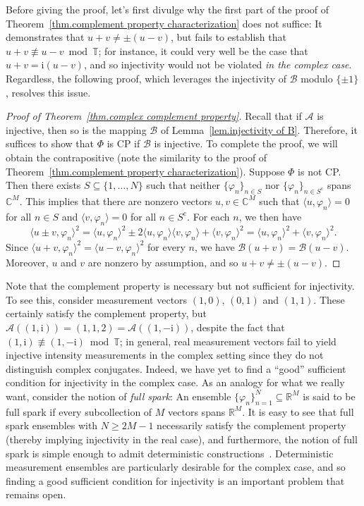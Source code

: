 \documentclass[times,10pt]{elsarticle}
\theoremstyle{plain}
\begin{document}
Before giving the proof, let's first divulge why the first part of the proof of Theorem~\ref{thm.complement property characterization} does not suffice: 
It demonstrates that $u+v\neq\pm(u-v)$, but fails to establish that $u+v\not\equiv u-v\bmod\mathbb{T}$; for instance, it could very well be the case that $u+v=\mathrm{i}(u-v)$, and so injectivity would not be violated \textit{in the complex case}.
Regardless, the following proof, which leverages the injectivity of $\mathcal{B}$ modulo $\{\pm1\}$, resolves this issue.

\begin{proof}[Proof of Theorem~\ref{thm.complex complement property}]
Recall that if $\mathcal{A}$ is injective, then so is the mapping $\mathcal{B}$ of Lemma~\ref{lem.injectivity of B}.
Therefore, it suffices to show that $\Phi$ is CP if $\mathcal{B}$ is injective.
To complete the proof, we will obtain the contrapositive (note the similarity to the proof of Theorem~\ref{thm.complement property characterization}).
Suppose $\Phi$ is not CP. 
Then there exists $S\subseteq\{1,\ldots,N\}$ such that neither $\{\varphi_n\}_{n\in S}$ nor $\{\varphi_n\}_{n\in S^\mathrm{c}}$ spans $\mathbb{C}^M$. 
This implies that there are nonzero vectors $u,v\in\mathbb{C}^M$ such that $\langle u,\varphi_n\rangle=0$ for all $n\in S$ and $\langle v,\varphi_n\rangle=0$ for all $n\in S^\mathrm{c}$.
For each $n$, we then have
\begin{equation*}
\langle u\pm v,\varphi_n\rangle^2
=\langle u,\varphi_n\rangle^2\pm2\langle u,\varphi_n\rangle\langle v,\varphi_n\rangle+\langle v,\varphi_n\rangle^2
=\langle u,\varphi_n\rangle^2+\langle v,\varphi_n\rangle^2.
\end{equation*}
Since $\langle u+v,\varphi_n\rangle^2=\langle u-v,\varphi_n\rangle^2$ for every $n$, we have $\mathcal{B}(u+v)=\mathcal{B}(u-v)$. 
Moreover, $u$ and $v$ are nonzero by assumption, and so $u+v\neq\pm(u-v)$.
\qquad
\end{proof}

Note that the complement property is necessary but not sufficient for injectivity.  
To see this, consider measurement vectors $(1,0)$, $(0,1)$ and $(1,1)$.  These certainly satisfy the complement property, but $\mathcal{A}((1,\mathrm{i}))=(1,1,2)=\mathcal{A}((1,-\mathrm{i}))$, despite the fact that $(1,\mathrm{i})\not\equiv(1,-\mathrm{i})\bmod\mathbb{T}$; in general, real measurement vectors fail to yield injective intensity measurements in the complex setting since they do not distinguish complex conjugates.
Indeed, we have yet to find a ``good'' sufficient condition for injectivity in the complex case.
As an analogy for what we really want, consider the notion of \textit{full spark}:
An ensemble $\{\varphi_n\}_{n=1}^N\subseteq\mathbb{R}^M$ is said to be full spark if every subcollection of $M$ vectors spans $\mathbb{R}^M$.
It is easy to see that full spark ensembles with $N\geq 2M-1$ necessarily satisfy the complement property (thereby implying injectivity in the real case), and furthermore, the notion of full spark is simple enough to admit deterministic constructions~\cite{AlexeevCM:12,PuschelK:05}.
Deterministic measurement ensembles are particularly desirable for the complex case, and so finding a good sufficient condition for injectivity is an important problem that remains open.
\end{document}
